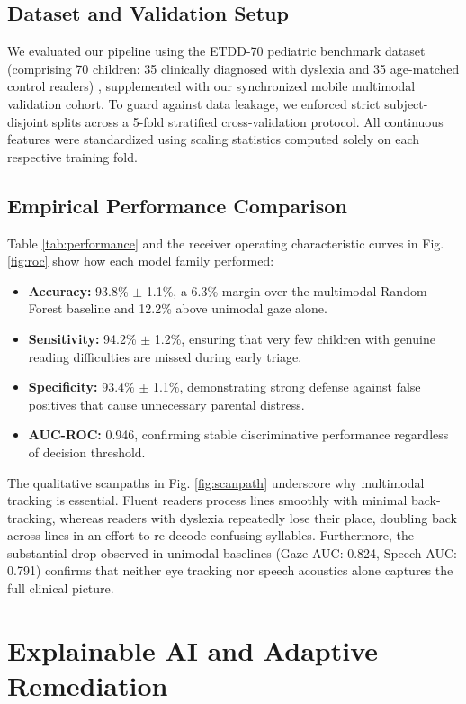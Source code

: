 \documentclass[conference]{IEEEtran}
\begin{document}
\subsection{Dataset and Validation Setup}
We evaluated our pipeline using the ETDD-70 pediatric benchmark dataset (comprising 70 children: 35 clinically diagnosed with dyslexia and 35 age-matched control readers) \cite{b1}, supplemented with our synchronized mobile multimodal validation cohort. To guard against data leakage, we enforced strict subject-disjoint splits across a 5-fold stratified cross-validation protocol. All continuous features were standardized using scaling statistics computed solely on each respective training fold.

\subsection{Empirical Performance Comparison}
Table \ref{tab:performance} and the receiver operating characteristic curves in Fig. \ref{fig:roc} show how each model family performed:
\begin{itemize}
    \item \textbf{Accuracy:} 93.8\% $\pm$ 1.1\%, a 6.3\% margin over the multimodal Random Forest baseline and 12.2\% above unimodal gaze alone.
    \item \textbf{Sensitivity:} 94.2\% $\pm$ 1.2\%, ensuring that very few children with genuine reading difficulties are missed during early triage.
    \item \textbf{Specificity:} 93.4\% $\pm$ 1.1\%, demonstrating strong defense against false positives that cause unnecessary parental distress.
    \item \textbf{AUC-ROC:} 0.946, confirming stable discriminative performance regardless of decision threshold.
\end{itemize}

The qualitative scanpaths in Fig. \ref{fig:scanpath} underscore why multimodal tracking is essential. Fluent readers process lines smoothly with minimal back-tracking, whereas readers with dyslexia repeatedly lose their place, doubling back across lines in an effort to re-decode confusing syllables. Furthermore, the substantial drop observed in unimodal baselines (Gaze AUC: 0.824, Speech AUC: 0.791) confirms that neither eye tracking nor speech acoustics alone captures the full clinical picture.

\section{Explainable AI and Adaptive Remediation}
\end{document}
